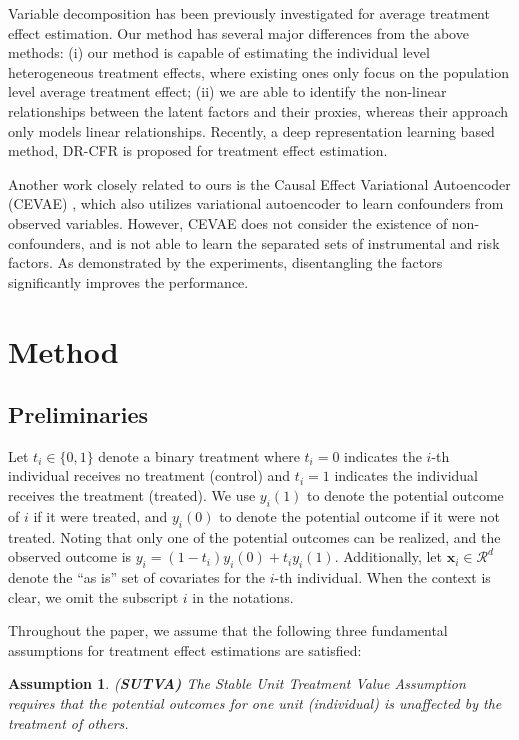 \documentclass[letterpaper]{article} %
\begin{document}
Variable decomposition \cite{Kun2017,Haeggstroem2017} has been previously investigated for average treatment effect estimation. 
Our method has several major differences from the above methods: (i) our method is capable of estimating the individual level heterogeneous treatment effects, where existing ones only focus on the population level average treatment effect; (ii) we are able to identify the non-linear relationships between the latent factors and their proxies, whereas their approach only models linear relationships. Recently, a deep representation learning based method, DR-CFR \cite{Hassanpour2020} is proposed for treatment effect estimation.

Another work closely related to ours is the Causal Effect Variational Autoencoder (CEVAE) \cite{Louizos2017}, which also utilizes variational autoencoder to learn confounders from observed variables. However, CEVAE does not consider the existence of non-confounders, and is not able to learn the separated sets of instrumental and risk factors. 
As demonstrated by the experiments, disentangling the factors significantly improves the performance.



\section*{Method}

\subsection*{Preliminaries}
Let $t_i \in \{0,1\}$ denote a binary treatment where $t_i = 0$ indicates the $i$-th individual receives no treatment (control) and $t_i = 1$ indicates the individual receives the treatment (treated). We use $y_i(1)$ to denote the potential outcome of $i$ if it were treated, and $y_i(0)$ to denote the potential outcome if it were not treated. Noting that only one of the potential outcomes can be realized, and the observed outcome is $y_i = (1-t_i)y_i(0) + t_i y_i(1)$. Additionally, let $\mathbf{x}_i \in \mathcal{R}^d$ denote the ``as is'' set of covariates for the $i$-th individual. When the context is clear, we omit the subscript $i$ in the notations.

Throughout the paper, we assume that the following three fundamental assumptions for treatment effect estimations \cite{Rosenbaum1983} are satisfied:
\newtheorem{assumption}{Assumption}
\begin{assumption}
	(\textbf{SUTVA)} The Stable Unit Treatment Value Assumption requires that the potential outcomes for one unit (individual) is unaffected by the treatment of others.
\end{assumption}
\end{document}
